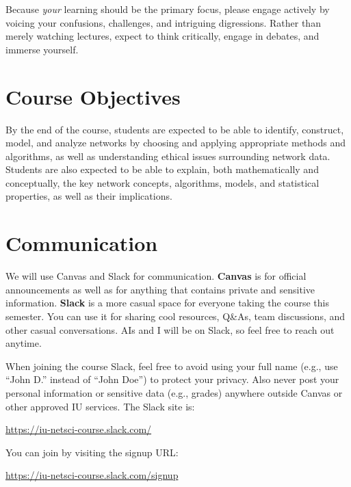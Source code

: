 \documentclass[11pt,article,oneside]{memoir} %
\begin{document}
Because \emph{your} learning should be the primary focus, please engage actively by voicing your confusions, challenges, and intriguing digressions. Rather than merely watching lectures, expect to think critically, engage in debates, and immerse yourself. 

\section{Course Objectives} %

By the end of the course, students are expected to be able to identify, construct, model, and analyze networks by choosing and applying appropriate methods and algorithms, as well as understanding ethical issues surrounding network data.
Students are also expected to be able to explain, both mathematically and conceptually, the key network concepts, algorithms, models, and statistical properties, as well as their implications.
\section{Communication} %

We will use Canvas and Slack for communication. \textbf{Canvas} is for official announcements as well as for anything that contains private and sensitive information. \textbf{Slack} is a more casual space for everyone taking the course this semester. You can use it for sharing cool resources, Q\&As, team discussions, and other casual conversations. AIs and I will be on Slack, so feel free to reach out anytime. 

When joining the course Slack, feel free to avoid using your full name (e.g., use ``John D.'' instead of ``John Doe'') to protect your privacy. 
Also never post your personal information or sensitive data (e.g., grades) anywhere outside Canvas or other approved IU services. 
The Slack site is:

\url{https://iu-netsci-course.slack.com/}

You can join by visiting the signup URL:

\url{https://iu-netsci-course.slack.com/signup}
\end{document}
